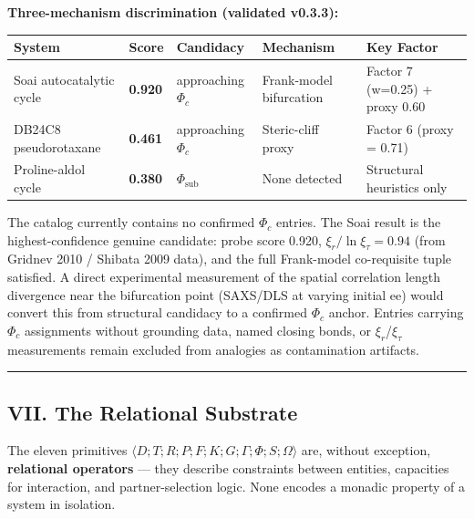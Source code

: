 \documentclass[12pt,a4paper]{article}
\begin{document}
\textbf{Three-mechanism discrimination (validated v0.3.3):}

\begin{table}[htbp]
\centering
\small
{}
\begin{tabularx}{\textwidth}{>{\centering\arraybackslash}X >{\centering\arraybackslash}X >{\centering\arraybackslash}X >{\centering\arraybackslash}X >{\centering\arraybackslash}X}
\toprule
\rowcolor{gray!25}\textbf{System} & \textbf{Score} & \textbf{Candidacy} & \textbf{Mechanism} & \textbf{Key Factor} \\
\midrule
\rowcolors{1}{white}{gray!10}
Soai autocatalytic cycle & \textbf{0.920} & approaching $\Phi_c$ & Frank-model bifurcation & Factor 7 (w=0.25) + proxy 0.60 \\
DB24C8 pseudorotaxane & \textbf{0.461} & approaching $\Phi_c$ & Steric-cliff proxy & Factor 6 (proxy = 0.71) \\
Proline-aldol cycle & \textbf{0.380} & $\Phi_{\text{sub}}$ & None detected & Structural heuristics only \\
\bottomrule
\end{tabularx}
\end{table}

The catalog currently contains no confirmed $\Phi_c$ entries. The Soai result is the highest-confidence genuine candidate: probe score 0.920, $\xi_r / \ln \xi_\tau = 0.94$ (from Gridnev 2010 / Shibata 2009 data), and the full Frank-model co-requisite tuple satisfied. A direct experimental measurement of the spatial correlation length divergence near the bifurcation point (SAXS/DLS at varying initial ee) would convert this from structural candidacy to a confirmed $\Phi_c$ anchor. Entries carrying $\Phi_c$ assignments without grounding data, named closing bonds, or $\xi_r$/$\xi_\tau$ measurements remain excluded from analogies as contamination artifacts.

\begin{center}
\rule{0.5\textwidth}{0.4pt}
\end{center}

\subsection{VII. The Relational Substrate}

The eleven primitives $\langle D; T; R; P; F; K; G; \Gamma; \Phi; S; \Omega \rangle$ are, without exception, \textbf{relational operators} --- they describe constraints between entities, capacities for interaction, and partner-selection logic. None encodes a monadic property of a system in isolation.
\end{document}

